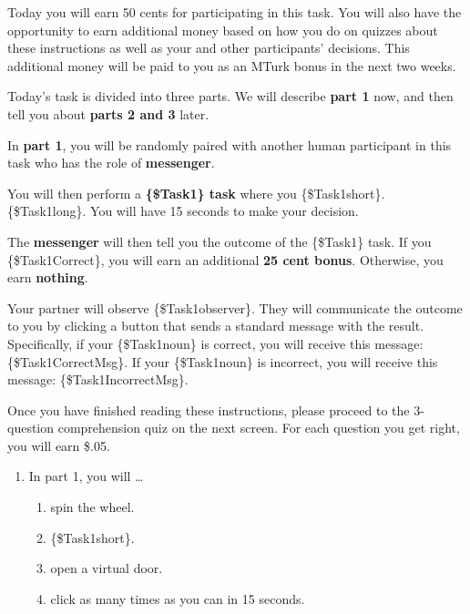 \begin{description}[listparindent = 1.5em]
\item[Overview Instructions] \hspace{1cm}

Today you will earn 50 cents for participating in this task. You
will also have the opportunity to earn additional money based on how you do on
quizzes about these instructions as well as your and other participants'
decisions. This additional money will be paid to you as an MTurk bonus in the
next two weeks. 

Today's task is divided into three parts. We will describe \textbf{part
1} now, and then tell you about \textbf{parts 2 and 3} later.

\item[Part 1 Instructions: \{\$Task1\} task] \hspace{1cm}

In \textbf{part 1}, you will be randomly paired
with another human participant in this task who has the role of \textbf{messenger}. 

You
will then perform a \textbf{\{\$Task1\} task} where you \{\$Task1short\}. \{\$Task1long\}. You
will have 15 seconds to make your decision.

The \textbf{messenger} will then tell you the
outcome of the \{\$Task1\} task. If you \{\$Task1Correct\}, you will earn an additional
\textbf{25 cent bonus}. Otherwise, you earn \textbf{nothing}. 

Your partner will observe
\{\$Task1observer\}. They will communicate the outcome to you by clicking a button
that sends a standard message with the result. Specifically, if your \{\$Task1noun\}
is correct, you will receive this message: \{\$Task1CorrectMsg\}. If your
\{\$Task1noun\} is incorrect, you will receive this message: \{\$Task1IncorrectMsg\}.

Once you have finished reading these instructions, please proceed to the
3-question comprehension quiz on the next {screen}. For each question you get
right, you will earn \$.05.

\item[Part 1 Quiz Question 1] \hspace{1cm}
\begin{enumerate}
\item In part 1, you will \ldots
\begin{enumerate}
    \item spin the wheel. 
\item \{\$Task1short\}. 
    \item open a virtual door. 
    \item click as many times as you can in 15 seconds. 
\end{enumerate}
\end{enumerate}


\end{description}
